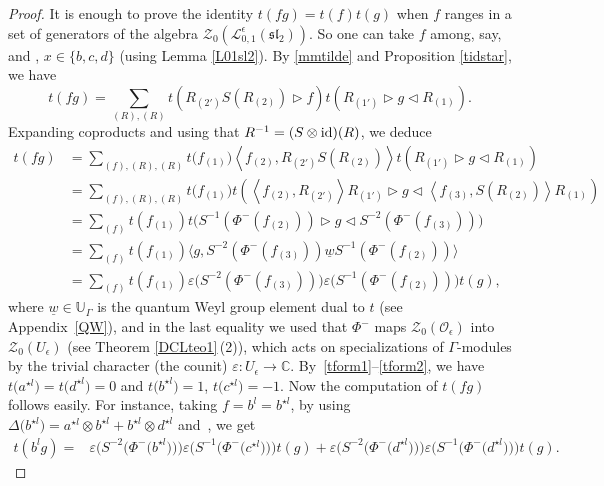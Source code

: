 \documentclass[pdftex]{sigma}
\numberwithin{equation}{section}
\theoremstyle{definition}
\newcommand{\e}{\epsilon}
\newcommand{\mc}{\mathbb{C}}
\newcommand{\Ll}{{\mathcal L}}
\newcommand{\Oo}{{\mathcal O}}
\newcommand{\ra}{\rightarrow}
\begin{document}
\begin{proof}
It is enough to prove the identity $t(fg) = t(f)t(g)$ when $f$ ranges in a set of generators of the algebra $\mathcal{Z}_0(\Ll_{0,1}^\e({\mathfrak{sl}_2}))$. So one can take $f$ among, say,  and , $x\in \{b,c,d\}$ (using Lemma \ref{L01sl2}). By \eqref{mmtilde} and Proposition \ref{tidstar}, we have
\[t(fg) = \sum_{(R),(R)} t\left(R_{(2')}{S}(R_{(2)}) \rhd f\right) t\left(R_{(1')}\rhd g \lhd R_{(1)}\right).\]
Expanding coproducts and using that $R^{-1} = (S\otimes {\rm id})(R)$, we deduce
\begin{align*}\label{tprod1}
 t(fg) & = \sum_{(f),(R),(R)} t\big(f_{(1)}\big) \left\langle f_{(2)} , R_{(2')}{S}(R_{(2)}) \right\rangle t\left(R_{(1')}\rhd g \lhd R_{(1)}\right)\\
 & = \sum_{(f),(R),(R)} t\big(f_{(1)}\big) t(\left\langle f_{(2)} , R_{(2')}\right\rangle R_{(1')}\rhd g \lhd \left\langle f_{(3)} ,S(R_{(2)}) \right\rangle R_{(1)})\\
 & = \sum_{(f)} t(f_{(1)}) t\big( S^{-1}(\Phi^-(f_{(2)}))\rhd g \lhd S^{-2}(\Phi^-(f_{(3)}))\big)\\
 & = \sum_{(f)} t(f_{(1)}) \big\langle g, S^{-2}(\Phi^-(f_{(3)}))\underline{w} S^{-1}(\Phi^-(f_{(2)})) \big\rangle\\
 & = \sum_{(f)} t(f_{(1)}) \varepsilon\big( S^{-2}(\Phi^-(f_{(3)})) \big) \varepsilon\big( S^{-1}(\Phi^-(f_{(2)})) \big) t(g),
\end{align*}
where $\underline{w}\in\mathbb{U}_\Gamma$ is the quantum Weyl group element dual to $t$ (see Appendix~\ref{QW}), and in the last equality we used that $\Phi^-$ maps $\mathcal{Z}_0(\Oo_\e)$ into $\mathcal{Z}_0(U_\e)$ (see Theorem \ref{DCLteo1}\,(2)), which acts on specializations of $\Gamma$-modules by the trivial character (the counit) $\varepsilon \colon U_\e \ra \mc$. \mbox{By~\eqref{tform1}--\eqref{tform2}}, we have $t\big(a^{\star l}\big)=t\big(d^{\star l}\big)=0$ and $t\big(b^{\star l}\big)=1$, $t\big(c^{\star l}\big)=-1$. Now the computation of $t(fg)$ follows easily. For instance, taking $f=b^l=b^{\star l}$, by using $\Delta\big(b^{\star l}\big) = a^{\star l}\otimes b^{\star l}+b^{\star l}\otimes d^{\star l}$ and~, we get
\begin{align*}
 t(b^lg) ={}& \varepsilon\big( S^{-2}\big(\Phi^-\big(b^{\star l}\big)\big) \big) \varepsilon\big( S^{-1}\big(\Phi^-\big(c^{\star l}\big)\big) \big) t(g) + \varepsilon\big( S^{-2}\big(\Phi^-\big(d^{\star l}\big)\big) \big) \varepsilon\big( S^{-1}\big(\Phi^-\big(d^{\star l}\big)\big) \big) t(g).

\end{align*}
\end{proof}
\end{document}
